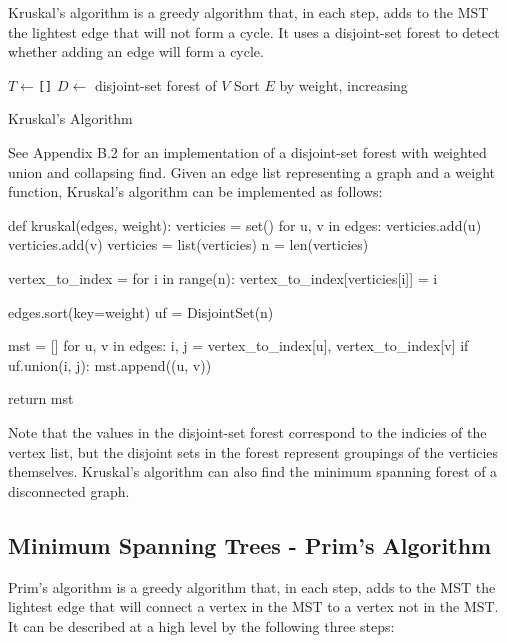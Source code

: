 \documentclass[12pt, titlepage]{article}
\begin{document}
Kruskal's algorithm is a greedy algorithm that, in each step, adds to the MST the lightest edge that will not form a cycle. It uses a disjoint-set forest to detect whether adding an edge will form a cycle. \\

\begin{algorithm}[H]
  \SetAlgoLined
  \DontPrintSemicolon
  $T \longleftarrow$\hspace{0.5mm}\texttt{[]}\;
  $D \longleftarrow$\hspace{0.5mm} disjoint-set forest of $V$\;
  Sort $E$ by weight, increasing\;
  \;
  \caption{Kruskal's Algorithm}
\end{algorithm} \medskip

See Appendix B.2 for an implementation of a disjoint-set forest with weighted union and collapsing find. Given an edge list representing a graph and a weight function, Kruskal's algorithm can be implemented as follows: \medskip

\begin{python}
def kruskal(edges, weight):
    verticies = set()
    for u, v in edges:
        verticies.add(u)
        verticies.add(v)
    verticies = list(verticies)
    n = len(verticies)

    vertex_to_index = {}
    for i in range(n):
        vertex_to_index[verticies[i]] = i

    edges.sort(key=weight)
    uf = DisjointSet(n)

    mst = []
    for u, v in edges:
        i, j = vertex_to_index[u], vertex_to_index[v]
        if uf.union(i, j):
            mst.append((u, v))

    return mst
\end{python}

Note that the values in the disjoint-set forest correspond to the indicies of the vertex list, but the disjoint sets in the forest represent groupings of the verticies themselves. Kruskal's algorithm can also find the minimum spanning forest of a disconnected graph.

\subsection{Minimum Spanning Trees - Prim's Algorithm}
Prim's algorithm is a greedy algorithm that, in each step, adds to the MST the lightest edge that will connect a vertex in the MST to a vertex not in the MST. It can be described at a high level by the following three steps:
\end{document}
